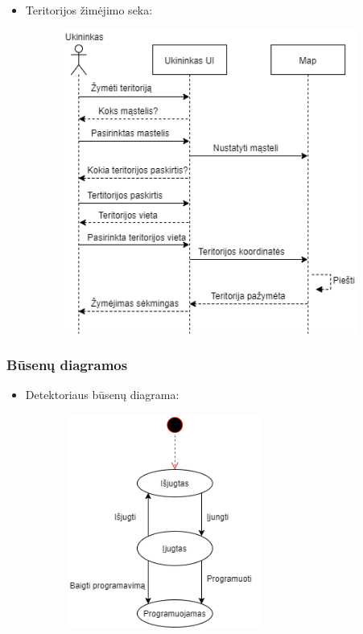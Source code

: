 \documentclass[oneside]{VUMIFPSkursinis}
\begin{document}
\begin{itemize}
\item Teritorijos žimėjimo seka:
	\begin{figure}[H]
		\centering	
	\includegraphics[width=10cm,height=10cm,keepaspectratio]{ŽymėtiTeritorijas.png}
	\caption{}
	\label{fig:ŽymėtiTeritorijas}
\end{figure}

\end{itemize}
\subsubsection{Būsenų diagramos}
\begin{itemize}
\item Detektoriaus būsenų diagrama:

		\begin{figure}[H]
		\centering	
	\includegraphics[width=7cm,height=7cm,keepaspectratio]{BusenuDetektorius.png}
	\caption{}
	\label{fig:BusenuDetektorius}
\end{figure}

\end{itemize}
\end{document}
